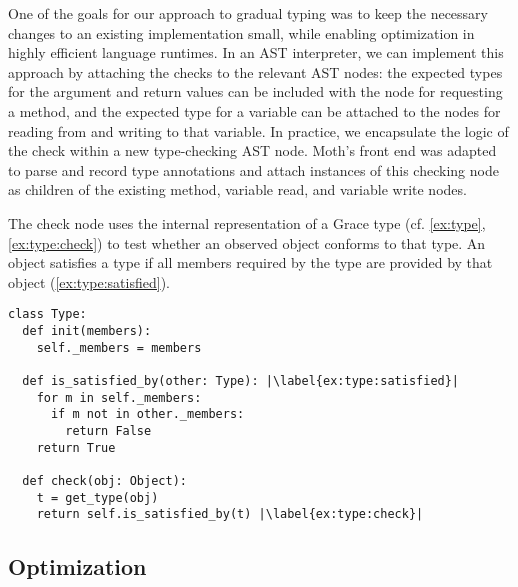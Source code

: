 
One of the goals for our approach to gradual typing was to keep
the necessary changes to an existing implementation small,
while enabling optimization in highly efficient language runtimes.
%
In an AST interpreter, we can implement this approach by attaching the
checks to the relevant AST nodes: the expected types for the argument
and return values can be included with the node for requesting a
method, and the expected type for a variable can be attached to the
nodes for reading from and writing to that variable.  In practice, we
encapsulate the logic of the check within a new type-checking AST
node.  Moth's front end was adapted to parse and record type
annotations and attach instances of this checking node as children of the
existing method, variable read, and variable write nodes.



%

The check node uses the internal representation of a Grace type
(cf. \cref{ex:type}, \cref{ex:type:check}) to test whether an observed
object conforms to that type. 
An object satisfies a type if all members required by the type are provided
by that object (\cref{ex:type:satisfied}).


\begin{lstlisting}[label={ex:type},escapechar=|,caption={Sketch of a \code{Type} in our system and its \code{check()} semantics.},float,floatplacement=htb,columns=flexible,float,floatplacement=H]
class Type:
  def init(members):
    self._members = members

  def is_satisfied_by(other: Type): |\label{ex:type:satisfied}|
    for m in self._members:
      if m not in other._members:
        return False
    return True

  def check(obj: Object):
    t = get_type(obj)
    return self.is_satisfied_by(t) |\label{ex:type:check}|
\end{lstlisting}


\subsection{Optimization}
\label{ssec:optimization}

